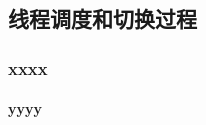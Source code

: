 % 
% 
% 
% 
% 
% 
\subsection{线程调度和切换过程} %
\begin{frame}[fragile]
    \frametitle{xxxx}
    \framesubtitle{yyyy}
\end{frame}

% 
% 
% 
% 
% 

